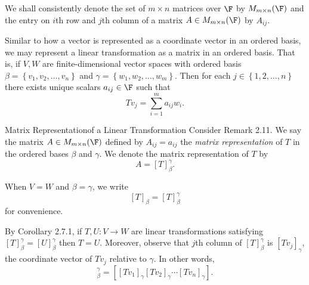 \documentclass[linearalgebraI]{subfiles}
\begin{document}
    \begin{remark}
        We shall consistently denote the set of $m\times n$ matrices over $\F$ by $M_{m\times n}(\F)$ and the entry on $i$th row and $j$th column of a matrix $A\in M_{m\times n}(\F)$ by $A_{ij}$.
    \end{remark}

    \begin{remark}
        Similar to how a vector is represented as a coordinate vector in an ordered basis, we may represent a linear transformation as a matrix in an ordered basis. That is, if $V,W$ are finite-dimensional vector spaces with ordered basis $\beta = \left\lbrace v_1, v_2, \ldots, v_n \right\rbrace$ and $\gamma = \left\lbrace w_1, w_2, \ldots, w_m \right\rbrace$. Then for each $j\in \left\lbrace 1, 2, \ldots, n \right\rbrace$ there exists unique scalars $a_{ij}\in \F$ such that
        \begin{equation*}
            Tv_j = \sum^m_{i=1} a_{ij}w_i.
        \end{equation*}
    \end{remark}

    \begin{definition}{Matrix Representation}{of a Linear Transformation}
        Consider Remark 2.11. We say the matrix $A\in M_{m\times n}(\F)$ defined by $A_{ij}=a_{ij}$ the \emph{matrix representation} of $T$ in the ordered bases $\beta$ and $\gamma$. We denote the matrix representation of $T$ by 
        \begin{equation*}
            A = \left[ T \right]^\gamma_\beta.
        \end{equation*}
    \end{definition}

    \begin{remark}
        When $V=W$ and $\beta = \gamma$, we write
        \begin{equation*}
            \left[ T \right]_\beta = \left[ T \right]^\gamma_\beta
        \end{equation*}
        for convenience.
    \end{remark}

    \begin{remark}
        By Corollary 2.7.1, if $T, U: V\to W$ are linear transformations satisfying $[T]^\gamma_\beta = [U]^\gamma_\beta$ then $T=U$. Moreover, observe that $j$th column of $[T]^\gamma_\beta$ is $\left[ Tv_j \right] _\gamma$, the coordinate vector of $Tv_j$ relative to $\gamma$. In other words,
        \begin{equation*}
            [T]^\gamma_\beta = \left[ \left[ Tv_1 \right]_\gamma \left[ Tv_2 \right]_\gamma \cdots \left[ Tv_n \right]_\gamma \right].
        \end{equation*}
    \end{remark}
\end{document}
